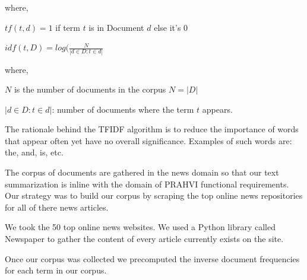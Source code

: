 where,

	\forceindent $tf(t, d) = 1$ if term $t$	is in Document $d$ else it's $0$

	\forceindent $idf(t, D) = log(\frac{N}{|d \in D : t \in d|}$

where,

	\forceindent $N$ is the number of documents in the corpus $N = |D|$

	\forceindent ${|d \in D : t \in d|}$: number of documents where the term $t$ appears.

The rationale behind the TFIDF algorithm is to reduce the importance of words that appear often yet have no overall significance. Examples of such words are: the, and, is, etc.


The corpus of documents are gathered in the news domain so that our text summarization is inline with the domain of PRAHVI functional requirements. Our strategy was to build our corpus by scraping the top online news repositories for all of there news articles. 

We took the 50 top online news websites. We used a Python library called Newspaper to gather the content of every article currently exists on the site.

Once our corpus was collected we precomputed the inverse document frequencies for each term in our corpus.
